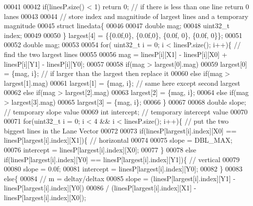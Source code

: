 \begin{DoxyCode}
00041 
00042     \textcolor{keywordflow}{if}(linesP.size() < 1) \textcolor{keywordflow}{return} 0; \textcolor{comment}{// if there is less than one line return 0 lanes}
00043 
00044     \textcolor{comment}{// store index and magnitiude of largest lines and a temporary magnitude}
00045     \textcolor{keyword}{struct} linedata\{
00046 
00047       \textcolor{keywordtype}{double} mag;
00048       uint32\_t index;
00049 
00050     \} largest[4] = \{\{0.0f,0\}, \{0.0f,0\}, \{0.0f, 0\}, \{0.0f, 0\}\};
00051 
00052     \textcolor{keywordtype}{double} mag;
00053 
00054     \textcolor{keywordflow}{for}( uint32\_t i = 0; i < linesP.size(); i++)\{  \textcolor{comment}{// find the two largest lines}
00055 
00056         mag = linesP[i][X1] - linesP[i][X0] + linesP[i][Y1] - linesP[i][Y0];
00057 
00058         \textcolor{keywordflow}{if}(mag > largest[0].mag)
00059             largest[0] = \{mag, i\}; \textcolor{comment}{// if larger than the largest then replace it}
00060         \textcolor{keywordflow}{else} \textcolor{keywordflow}{if}(mag > largest[1].mag)
00061             largest[1] = \{mag, i\}; \textcolor{comment}{// same here except second largest}
00062         \textcolor{keywordflow}{else} \textcolor{keywordflow}{if}(mag > largest[2].mag)
00063             largest[2] = \{mag, i\};
00064         \textcolor{keywordflow}{else} \textcolor{keywordflow}{if}(mag > largest[3].mag)
00065             largest[3] = \{mag, i\};
00066     \}
00067 
00068     \textcolor{keywordtype}{double} slope; \textcolor{comment}{// temporary slope value}
00069     \textcolor{keywordtype}{int} intercept; \textcolor{comment}{// temporary intercept value}
00070 
00071     \textcolor{keywordflow}{for}(uint32\_t i = 0; i < 4 && i < linesP.size(); i++)\{  \textcolor{comment}{// put the two biggest lines in the Lane
       Vector }
00072 
00073         \textcolor{keywordflow}{if}(linesP[largest[i].index][X0] == linesP[largest[i].index][X1])\{ \textcolor{comment}{// horizontal }
00074 
00075             slope = DBL\_MAX;
00076             intercept = linesP[largest[i].index][X0];
00077         \}
00078         \textcolor{keywordflow}{else} \textcolor{keywordflow}{if}(linesP[largest[i].index][Y0] == linesP[largest[i].index][Y1])\{ \textcolor{comment}{// vertical}
00079 
00080             slope = 0.0f;
00081             intercept = linesP[largest[i].index][Y0];
00082         \}
00083         \textcolor{keywordflow}{else}\{
00084         \textcolor{comment}{// m = deltay/deltax}
00085         slope = (linesP[largest[i].index][Y1] - linesP[largest[i].index][Y0])
00086                     / (linesP[largest[i].index][X1] - linesP[largest[i].index][X0]);

\end{DoxyCode}
